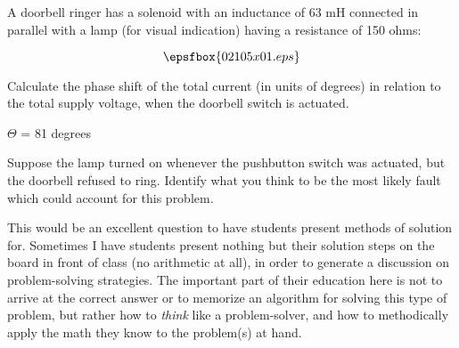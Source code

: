 

A doorbell ringer has a solenoid with an inductance of 63 mH connected in parallel with a lamp (for visual indication) having a resistance of 150 ohms:

$$\epsfbox{02105x01.eps}$$

Calculate the phase shift of the total current (in units of degrees) in relation to the total supply voltage, when the doorbell switch is actuated.







$\Theta$ = 81 degrees

\vskip 10pt

Suppose the lamp turned on whenever the pushbutton switch was actuated, but the doorbell refused to ring.  Identify what you think to be the most likely fault which could account for this problem.







This would be an excellent question to have students present methods of solution for.  Sometimes I have students present nothing but their solution steps on the board in front of class (no arithmetic at all), in order to generate a discussion on problem-solving strategies.  The important part of their education here is not to arrive at the correct answer or to memorize an algorithm for solving this type of problem, but rather how to {\it think} like a problem-solver, and how to methodically apply the math they know to the problem(s) at hand.




